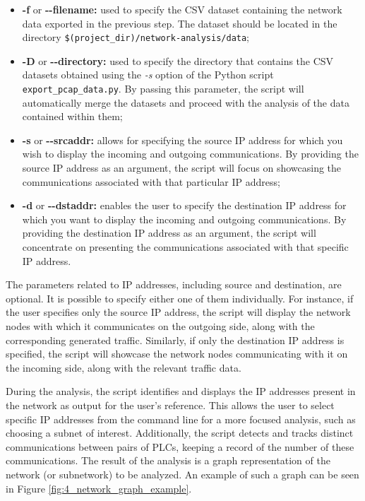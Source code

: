 \begin{itemize}
	\item \textbf{-f} or \textbf{{-}{-}filename:} used to specify the CSV dataset containing the network data exported in the previous step. The dataset should be located in the directory \texttt{\$(project\_dir)/network-analysis/data};
	
	\item \textbf{-D} or \textbf{{-}{-}directory:} used to specify the directory that contains the CSV datasets obtained using the \textit{-s} option of the Python script \texttt{export\_pcap\_data.py}. By passing this parameter, the script will automatically merge the datasets and proceed with the analysis of the data contained within them;
	
	\item \textbf{-s} or \textbf{{-}{-}srcaddr:} allows for specifying the source IP address for which you wish to display the incoming and outgoing communications. By providing the source IP address as an argument, the script will focus on showcasing the communications associated with that particular IP address;
	
	\item \textbf{-d} or \textbf{{-}{-}dstaddr:} enables the user to specify the destination IP address for which you want to display the incoming and outgoing communications. By providing the destination IP address as an argument, the script will concentrate on presenting the communications associated with that specific IP address.
\end{itemize}

The parameters related to IP addresses, including source and destination, are optional. It is possible to specify either one of them individually. For instance, if the user specifies only the source IP address, the script will display the network nodes with which it communicates on the outgoing side, along with the corresponding generated traffic. Similarly, if only the destination IP address is specified, the script will showcase the network nodes communicating with it on the incoming side, along with the relevant traffic data.

\bigskip
During the analysis, the script identifies and displays the IP addresses present in the network as output for the user's reference. This allows the user to select specific IP addresses from the command line for a more focused analysis, such as choosing a subnet of interest. Additionally, the script detects and tracks distinct communications between pairs of PLCs, keeping a record of the number of these communications.\newline
The result of the analysis is a graph representation of the network (or subnetwork) to be analyzed. An example of such a graph can be seen in Figure \ref{fig:4_network_graph_example}. 

